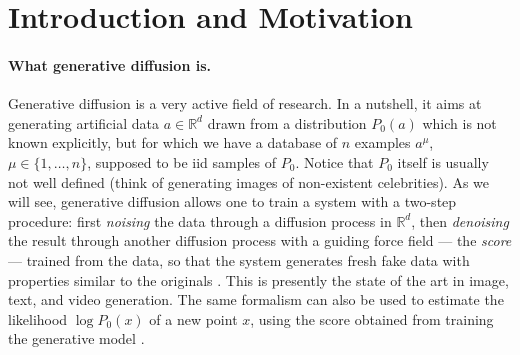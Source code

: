 \documentclass[11pt]{article}
\theoremstyle{definition}
\newcommand{\R}{\mathbb{R}}
\begin{document}
\tableofcontents


\section{Introduction and Motivation}\label{sec:intro}

\paragraph{What generative diffusion is.} Generative diffusion is a
very active field of research. In a nutshell, it aims at generating
artificial data \(a \in \R^d\) drawn from a distribution \(P_0(a)\)
which is not known explicitly, but for which we have a database of
\(n\) examples \(a^{\mu}\), \(\mu \in \{1, \dots, n\}\), supposed to be
iid samples of \(P_0\). Notice that \(P_0\) itself is usually not well
defined (think of generating images of non-existent celebrities). As
we will see, generative diffusion allows one to train a system with a
two-step procedure: first \emph{noising} the data through a diffusion
process in \(\R^d\), then \emph{denoising} the result through another
diffusion process with a guiding force field --- the \emph{score} ---
trained from the data, so that the system generates fresh fake data
with properties similar to the originals
\citep{SohlDickstein2015, Ho2020, Song2021SDE,
Karras2022, Achilli2024}. This is presently the state of the art in
image, text, and video generation.
The same formalism can also be used to estimate the likelihood
\(\log P_0(x)\) of a new point \(x\), using the score obtained from
training the generative model
\citep{Song2021SDE}.
\end{document}
